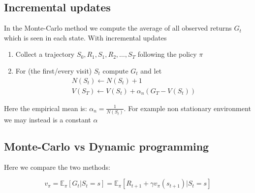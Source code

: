 \subsection{Incremental updates}
In the Monte-Carlo method we compute the average of all observed returns $G_t$ which is seen in each state. With incremental updates 

	\begin{enumerate}
		\item Collect a trajectory $S_0, R_1, S_1, R_2, \ldots, S_T$ following the policy $\pi$
		\item For (the first/every visit) $S_t$ compute $G_t$ and let 
			\begin{equation}
			\begin{aligned}
				N(S_t) \leftarrow N(S_t) + 1\\
				V(S_T) \leftarrow V(S_t) + \alpha_n (G_T - V(S_t))
			\end{aligned}
			\end{equation}
	\end{enumerate}

Here the empirical mean is: $\alpha_n = \frac{1} {N(S_t)}$. For example non stationary environment we may instead is a constant $\alpha$

\subsection{Monte-Carlo vs Dynamic programming}
Here we compare the two methods:

	\begin{equation}
		v_\pi = \mathbb{E}_\pi[G_t |S_t = s] = \mathbb{E}_\pi [R_{t+1}+\gamma v_\pi(s_{t+1}) | S_t = s]
	\end{equation}

